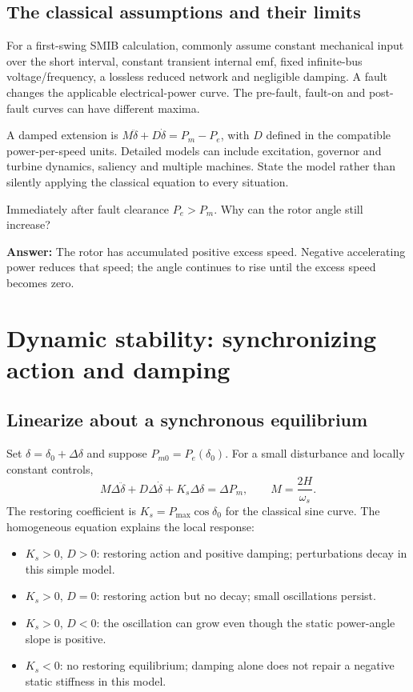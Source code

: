 \documentclass[11pt,a4paper]{article}
\newcommand{\chapterstart}[2]{\par\needspace{12\baselineskip}\section{#1}\label{#2}}
\newcommand{\checkq}[2]{\begin{tcolorbox}[breakable=false,colback=pale,colframe=teal,coltitle=white,title={Check your understanding}]#1\par\textbf{Answer:} #2\end{tcolorbox}}
\newcommand{\ans}[1]{\boxed{#1}}
\begin{document}
\subsection{The classical assumptions and their limits}
For a first-swing SMIB calculation, commonly assume constant mechanical input over the short interval, constant transient internal emf, fixed infinite-bus voltage/frequency, a lossless reduced network and negligible damping. A fault changes the applicable electrical-power curve. The pre-fault, fault-on and post-fault curves can have different maxima.

A damped extension is $M\ddot\delta+D\dot\delta=P_m-P_e$, with $D$ defined in the compatible power-per-speed units. Detailed models can include excitation, governor and turbine dynamics, saliency and multiple machines. State the model rather than silently applying the classical equation to every situation.
\checkq{Immediately after fault clearance $P_e>P_m$. Why can the rotor angle still increase?}{The rotor has accumulated positive excess speed. Negative accelerating power reduces that speed; the angle continues to rise until the excess speed becomes zero.}

\chapterstart{Dynamic stability: synchronizing action and damping}{dynamic}
\subsection{Linearize about a synchronous equilibrium}
Set $\delta=\delta_0+\Delta\delta$ and suppose $P_{m0}=P_e(\delta_0)$. For a small disturbance and locally constant controls,
\[
\ans{M\Delta\ddot\delta+D\Delta\dot\delta+K_s\Delta\delta
=\Delta P_m},\qquad M=\frac{2H}{\omega_s}.
\]
The restoring coefficient is $K_s=P_{\max}\cos\delta_0$ for the classical sine curve. The homogeneous equation explains the local response:
\begin{itemize}
\item $K_s>0$, $D>0$: restoring action and positive damping; perturbations decay in this simple model.
\item $K_s>0$, $D=0$: restoring action but no decay; small oscillations persist.
\item $K_s>0$, $D<0$: the oscillation can grow even though the static power-angle slope is positive.
\item $K_s<0$: no restoring equilibrium; damping alone does not repair a negative static stiffness in this model.
\end{itemize}
\end{document}
